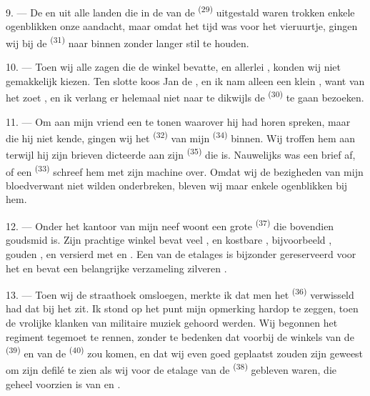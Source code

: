 9. --- De  en  uit alle landen die in de
 van de  \textsuperscript{(29)} uitgestald waren trokken
enkele ogenblikken onze aandacht, maar omdat het tijd was voor het vieruurtje, gingen wij bij
de  \textsuperscript{(31)} naar binnen zonder langer stil te houden.

10. --- Toen wij alle  zagen die de winkel bevatte,
 en allerlei , konden wij
niet gemakkelijk kiezen. Ten slotte koos Jan de , en ik nam alleen een
klein , want van het zoet , en ik verlang er
helemaal niet naar te dikwijls de  \textsuperscript{(30)} te gaan bezoeken.

\VUsaut{3.0mm}

11. --- Om aan mijn vriend een  te tonen waarover hij had horen
spreken, maar die hij niet kende, gingen wij het  \textsuperscript{(32)} van
mijn  \textsuperscript{(34)} binnen. Wij troffen hem aan terwijl hij zijn brieven
dicteerde aan zijn
 \textsuperscript{(35)} die  is.
Nauwelijks was een brief af, of een  \textsuperscript{(33)} schreef hem met
zijn machine over. Omdat wij de bezigheden van mijn bloedverwant niet wilden onderbreken,
bleven wij maar enkele ogenblikken bij hem.

12. --- Onder het kantoor van mijn neef woont een grote
 \textsuperscript{(37)} die bovendien goudsmid is.
Zijn prachtige winkel bevat veel ,
 en kostbare , bijvoorbeeld
, gouden ,  en
 versierd met  en . Een van
de etalages is bijzonder gereserveerd voor het  en bevat een belangrijke
verzameling zilveren .

13. --- Toen wij de straathoek omsloegen, merkte ik dat men het 
\textsuperscript{(36)} verwisseld had dat bij het  zit. Ik stond op het
punt mijn opmerking hardop te zeggen, toen de vrolijke klanken van
 militaire muziek gehoord werden. Wij begonnen het regiment tegemoet
te rennen, zonder te bedenken dat  voorbij de winkels van de
 \textsuperscript{(39)} en van de 
\textsuperscript{(40)} zou komen, en dat wij even goed geplaatst zouden zijn geweest om zijn
defilé te zien als wij voor de etalage van de  \textsuperscript{(38)}
gebleven waren, die geheel voorzien is van
 en .

